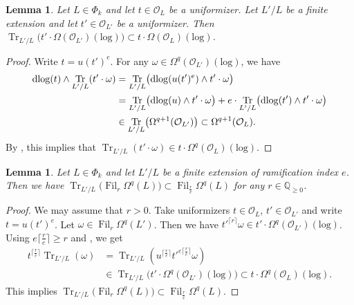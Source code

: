 \documentclass{amsart}
\theoremstyle{plain}
\newtheorem{lemma}[theorem]{Lemma}
\theoremstyle{definition}
\theoremstyle{remark}
\numberwithin{equation}{section}
\DeclareMathOperator{\Fil}{Fil}
\DeclareMathOperator{\Tr}{Tr}
\def\ceil#1{\lceil #1 \rceil}
\def\logrm{\mathrm{log}}
\begin{document}
\begin{lemma}\label{omega_trace}
	Let $L\in \Phi_k$ and let $t\in \mathcal{O}_L$ be a uniformizer.
	Let $L'/L$ be a finite extension and let $t'\in \mathcal{O}_{L'}$ be a uniformizer.
	Then $\Tr_{L'/L}\bigl(t'\cdot \Omega(\mathcal{O}_{L'})(\logrm)\bigr)\subset t\cdot \Omega(\mathcal{O}_L)(\logrm)$.
\end{lemma}

\begin{proof}
	Write $t=u(t')^e$.
	For any $\omega\in \Omega^q(\mathcal{O}_{L'})(\logrm)$, we have
	\begin{align*}
		\dlog(t)\wedge\Tr_{L'/L}(t'\cdot \omega)&{}=\Tr_{L'/L}\bigl(\dlog(u(t')^e)\wedge t'\cdot \omega\bigr)\\
		&{}=\Tr_{L'/L}\bigl(\dlog(u)\wedge t'\cdot \omega\bigr) + e\cdot\Tr_{L'/L}\bigl(\dlog(t')\wedge t'\cdot \omega\bigr)\\
		&{}\in \Tr_{L'/L}\bigl(\Omega^{q+1}(\mathcal{O}_{L'})\bigr)\subset \Omega^{q+1}(\mathcal{O}_L).
	\end{align*}
	By , this implies that $\Tr_{L'/L}(t'\cdot \omega)\in t\cdot \Omega^q(\mathcal{O}_L)(\logrm)$.
\end{proof}

\begin{lemma}\label{omega_trace_axiom}
	Let $L\in \Phi_k$ and let $L'/L$ be a finite extension of ramification index $e$.
	Then we have $\Tr_{L'/L}\bigl(\Fil_r\Omega^q(L)\bigr)\subset \Fil_{\frac{r}{e}}\Omega^q(L)$ for any $r\in \mathbb{Q}_{\geq 0}$.
\end{lemma}

\begin{proof}
	We may assume that $r>0$.
	Take uniformizers $t\in \mathcal{O}_L$, $t'\in \mathcal{O}_{L'}$ and write $t=u(t')^e$.
	Let $\omega\in \Fil_r \Omega^q(L')$.
	Then we have $t'^{\ceil{r}}\omega\in t'\cdot \Omega^q(\mathcal{O}_{L'})(\logrm)$.
	Using $e\ceil{\frac{r}{e}}\geq r$ and , we get
	\begin{align*}
		t^{\ceil{\frac{r}{e}}}\Tr_{L'/L}(\omega)&=\Tr_{L'/L}(u^{\ceil{\frac{r}{e}}}t'^{e\ceil{\frac{r}{e}}}\omega)\\
		&\in \Tr_{L'/L}\bigl(t'\cdot \Omega^q(\mathcal{O}_{L'})(\logrm)\bigr)\subset t\cdot \Omega^q(\mathcal{O}_L)(\logrm).
	\end{align*}
	This implies $\Tr_{L'/L}\bigl(\Fil_r\Omega^q(L)\bigr)\subset \Fil_{\frac{r}{e}}\Omega^q(L)$.
\end{proof}
\end{document}
